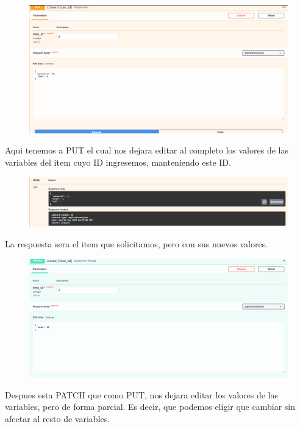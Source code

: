 \documentclass[12pt]{article}
\begin{document}
\begin{figure}[H]
    \centering
    \includegraphics[width=1\textwidth]{Imagenes/PUT1.png}
\end{figure}
Aqui tenemos a PUT el cual nos dejara editar al completo los valores de las variables del item cuyo ID ingresemos, manteniendo este ID.

\begin{figure}[H]
    \centering
    \includegraphics[width=1\textwidth]{Imagenes/PUT2.png}
\end{figure}
La respuesta sera el item que solicitamos, pero con sus nuevos valores.

\begin{figure}[H]
    \centering
    \includegraphics[width=1\textwidth]{Imagenes/PATCH1.png}
\end{figure}
Despues esta PATCH que como PUT, nos dejara editar los valores de las variables, pero de forma parcial. Es decir, que podemos eligir que cambiar sin afectar al resto de variables.
\end{document}
